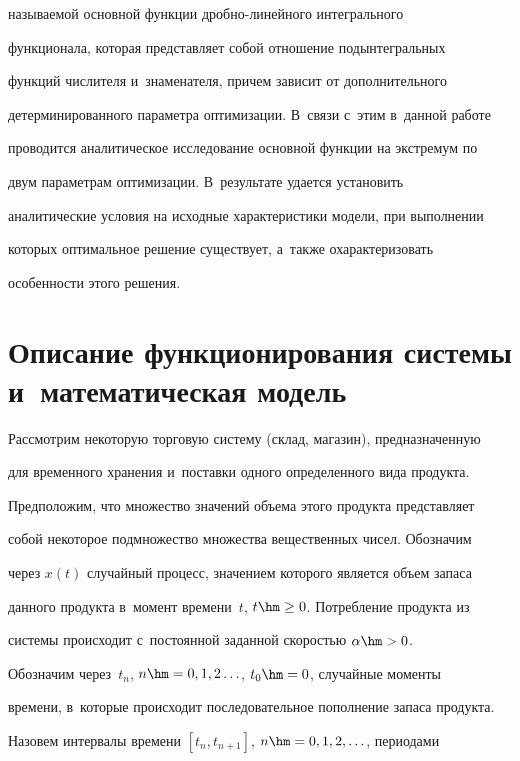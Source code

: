 называемой основной функции дроб\-но-ли\-ней\-но\-го интегрального 

функционала, которая представляет собой отношение подынтегральных 

функций числителя и~знаменателя, причем зависит от дополнительного 

детерминированного параметра оптимизации. В~связи с~этим в~данной работе 

проводится аналитическое исследование основной функции на экстремум по 

двум параметрам оптимизации. В~результате удается установить 

аналитические условия на исходные характеристики модели, при выполнении 

которых оптимальное решение существует, а~также охарактеризовать 

особенности этого решения.

{



}

  

\section{Описание функционирования системы и~математическая модель}



  Рассмотрим некоторую торговую систему (склад, магазин), предназначенную 

для временного хранения и~поставки одного определенного вида продукта. 

Предположим, что множество значений объема этого продукта представляет 

собой некоторое подмножество множества вещественных чисел. Обозначим 

через $x(t)$ случайный процесс, значением которого является объем запаса 

данного продукта в~момент времени~$t$, $t\hm\geq0$. Потребление продукта из 

системы происходит с~постоянной заданной скоростью $\alpha\hm>0$.

  

  Обозначим через~$t_n$, $n\hm=0,1,2\ldots$, $t_0\hm=0$, случайные моменты 

времени, в~которые происходит последовательное пополнение запаса продукта. 

Назовем интервалы времени $[t_n, t_{n+1}]$, $n\hm=0,1,2,\ldots $, периодами 

